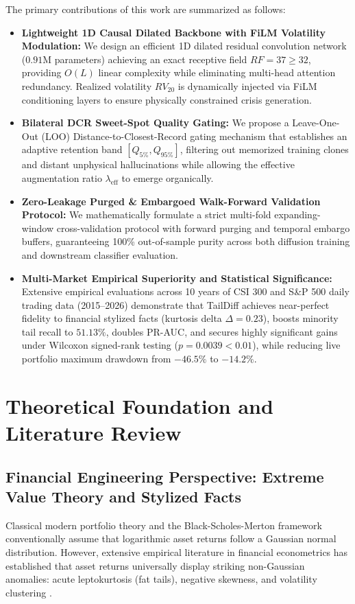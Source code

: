 \documentclass[preprint,12pt,authoryear]{elsarticle}
\begin{document}
The primary contributions of this work are summarized as follows:
\begin{itemize}[leftmargin=1.5em]
    \item \textbf{Lightweight 1D Causal Dilated Backbone with FiLM Volatility Modulation:} We design an efficient 1D dilated residual convolution network ($0.91$M parameters) achieving an exact receptive field $RF=37 \ge 32$, providing $O(L)$ linear complexity while eliminating multi-head attention redundancy. Realized volatility $RV_{20}$ is dynamically injected via FiLM conditioning layers to ensure physically constrained crisis generation.
    \item \textbf{Bilateral DCR Sweet-Spot Quality Gating:} We propose a Leave-One-Out (LOO) Distance-to-Closest-Record gating mechanism that establishes an adaptive retention band $[Q_{5\%}, Q_{95\%}]$, filtering out memorized training clones and distant unphysical hallucinations while allowing the effective augmentation ratio $\lambda_{\text{eff}}$ to emerge organically.
    \item \textbf{Zero-Leakage Purged \& Embargoed Walk-Forward Validation Protocol:} We mathematically formulate a strict multi-fold expanding-window cross-validation protocol with forward purging and temporal embargo buffers, guaranteeing 100\% out-of-sample purity across both diffusion training and downstream classifier evaluation.
    \item \textbf{Multi-Market Empirical Superiority and Statistical Significance:} Extensive empirical evaluations across 10 years of CSI 300 and S\&P 500 daily trading data (2015--2026) demonstrate that TailDiff achieves near-perfect fidelity to financial stylized facts (kurtosis delta $\Delta = 0.23$), boosts minority tail recall to $51.13\%$, doubles PR-AUC, and secures highly significant gains under Wilcoxon signed-rank testing ($p = 0.0039 < 0.01$), while reducing live portfolio maximum drawdown from $-46.5\%$ to $-14.2\%$.
\end{itemize}

\section{Theoretical Foundation and Literature Review}
\label{sec:related_work}

\subsection{Financial Engineering Perspective: Extreme Value Theory and Stylized Facts}
Classical modern portfolio theory and the Black-Scholes-Merton framework conventionally assume that logarithmic asset returns follow a Gaussian normal distribution. However, extensive empirical literature in financial econometrics has established that asset returns universally display striking non-Gaussian anomalies: acute leptokurtosis (fat tails), negative skewness, and volatility clustering \citep{mandelbrot1997fractals,cont2001empirical}. 
\end{document}
